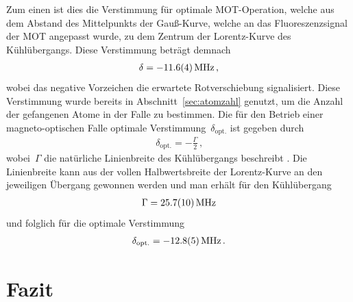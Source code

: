 \documentclass[11pt, a4paper]{article}
\numberwithin{equation}{section}
\begin{document}
Zum einen ist dies die Verstimmung für optimale MOT-Operation, welche aus dem Abstand des Mittelpunkts der Gauß-Kurve, welche an das Fluoreszenzsignal der MOT angepasst wurde, zu dem Zentrum der Lorentz-Kurve des Kühlübergangs.
Diese Verstimmung beträgt demnach
\begin{align*}
	\delta = \SI{-11.6 +- 0.4}{MHz} \, \text{,}
\end{align*}
wobei das negative Vorzeichen die erwartete Rotverschiebung signalisiert.
Diese Verstimmung wurde bereits in Abschnitt~\ref{sec:atomzahl} genutzt, um die Anzahl der gefangenen Atome in der Falle zu bestimmen.
Die für den Betrieb einer magneto-optischen Falle optimale Verstimmung~$\delta_\mathrm{opt.}$ ist gegeben durch
\begin{align*}
	\delta_\mathrm{opt.} = -\frac{\Gamma}{2} \, \text{,}
\end{align*}
wobei~$\Gamma$ die natürliche Linienbreite des Kühlübergangs beschreibt \cite{foot}.
Die Linienbreite kann aus der vollen Halbwertsbreite der Lorentz-Kurve an den jeweiligen Übergang gewonnen werden und man erhält für den Kühlübergang
\begin{align*}
	\Gamma = \SI{25.7 +- 1.0}{MHz}
\end{align*}
und folglich für die optimale Verstimmung
\begin{align*}
	\delta_\mathrm{opt.} = \SI{-12.8 +- 0.5}{MHz} \, \text{.}
\end{align*}






\section{Fazit}
\end{document}
